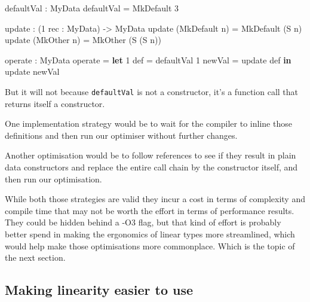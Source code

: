 \documentclass[
]{article}
\newenvironment{Shaded}{}{}
\newcommand{\DataTypeTok}[1]{\textcolor[rgb]{0.56,0.13,0.00}{#1}}
\newcommand{\DecValTok}[1]{\textcolor[rgb]{0.25,0.63,0.44}{#1}}
\newcommand{\KeywordTok}[1]{\textcolor[rgb]{0.00,0.44,0.13}{\textbf{#1}}}
\newcommand{\NormalTok}[1]{#1}
\newcommand{\OperatorTok}[1]{\textcolor[rgb]{0.40,0.40,0.40}{#1}}
\newcommand{\OtherTok}[1]{\textcolor[rgb]{0.00,0.44,0.13}{#1}}
\begin{document}
\begin{Shaded}
\begin{Highlighting}[]
\NormalTok{defaultVal }\OperatorTok{:} \DataTypeTok{MyData}
\NormalTok{defaultVal }\OtherTok{=} \DataTypeTok{MkDefault} \DecValTok{3}

\NormalTok{update }\OperatorTok{:}\NormalTok{ (}\DecValTok{1}\NormalTok{ rec }\OperatorTok{:} \DataTypeTok{MyData}\NormalTok{) }\OtherTok{{-}\textgreater{}} \DataTypeTok{MyData}
\NormalTok{update (}\DataTypeTok{MkDefault}\NormalTok{ n) }\OtherTok{=} \DataTypeTok{MkDefault}\NormalTok{ (}\DataTypeTok{S}\NormalTok{ n)}
\NormalTok{update (}\DataTypeTok{MkOther}\NormalTok{ n) }\OtherTok{=} \DataTypeTok{MkOther}\NormalTok{ (}\DataTypeTok{S}\NormalTok{ (}\DataTypeTok{S}\NormalTok{ n))}

\NormalTok{operate }\OperatorTok{:} \DataTypeTok{MyData}
\NormalTok{operate }\OtherTok{=} \KeywordTok{let} \DecValTok{1}\NormalTok{ def }\OtherTok{=}\NormalTok{ defaultVal}
              \DecValTok{1}\NormalTok{ newVal }\OtherTok{=}\NormalTok{ update def }\KeywordTok{in}
\NormalTok{              update newVal}
\end{Highlighting}
\end{Shaded}

But it will not because \texttt{defaultVal} is not a constructor, it's a
function call that returns itself a constructor.

One implementation strategy would be to wait for the compiler to inline
those definitions and then run our optimiser without further changes.

Another optimisation would be to follow references to see if they result
in plain data constructors and replace the entire call chain by the
constructor itself, and then run our optimisation.

While both those strategies are valid they incur a cost in terms of
complexity and compile time that may not be worth the effort in terms of
performance results. They could be hidden behind a -O3 flag, but that
kind of effort is probably better spend in making the ergonomics of
linear types more streamlined, which would help make those optimisations
more commonplace. Which is the topic of the next section.

\hypertarget{making-linearity-easier-to-use}{%
\subsection{Making linearity easier to
use}\label{making-linearity-easier-to-use}}
\end{document}

